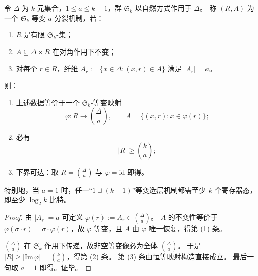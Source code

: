 \begin{theorem}\label{thm:conclusion-equivariant-a-splitting-register-lower-bound}
令 \(\Delta\) 为 \(k\)-元集合，\(1\le a\le k-1\)，群 \(\mathfrak S_k\) 以自然方式作用于 \(\Delta\)。
称 \((R,A)\) 为一个 \(\mathfrak S_k\)-等变 \(a\)-分裂机制，若：
\begin{enumerate}
  \item \(R\) 是有限 \(\mathfrak S_k\)-集；
  \item \(A\subseteq \Delta\times R\) 在对角作用下不变；
  \item 对每个 \(r\in R\)，纤维 \(A_r:=\{x\in\Delta:(x,r)\in A\}\) 满足 \(|A_r|=a\)。
\end{enumerate}
则：
\begin{enumerate}
  \item 上述数据等价于一个 \(\mathfrak S_k\)-等变映射
  \[
  \varphi:R\to \binom{\Delta}{a},
  \qquad
  A=\{(x,r):x\in\varphi(r)\};
  \]
  \item 必有
  \[
  |R|\ge \binom{k}{a};
  \]
  \item 下界可达：取 \(R=\binom{\Delta}{a}\) 与 \(\varphi=\mathrm{id}\) 即得。
\end{enumerate}
特别地，当 \(a=1\) 时，任一“\(1\sqcup(k-1)\)”等变选层机制都需至少 \(k\) 个寄存器态，即至少 \(\log_2 k\) 比特。
\end{theorem}
\begin{proof}
由 \(|A_r|=a\) 可定义 \(\varphi(r):=A_r\in\binom{\Delta}{a}\)。
\(A\) 的不变性等价于
\(
\varphi(\sigma\cdot r)=\sigma\cdot\varphi(r)
\)，故 \(\varphi\) 等变，且 \(A\) 由 \(\varphi\) 唯一恢复，得第 (1) 条。

\(\binom{\Delta}{a}\) 在 \(\mathfrak S_k\) 作用下传递，故非空等变像必为全体 \(\binom{\Delta}{a}\)。
于是
\(
|R|\ge |\mathrm{Im}\,\varphi|=\binom{k}{a}
\)，得第 (2) 条。
第 (3) 条由恒等映射构造直接成立。
最后一句取 \(a=1\) 即得。证毕。
\end{proof}

